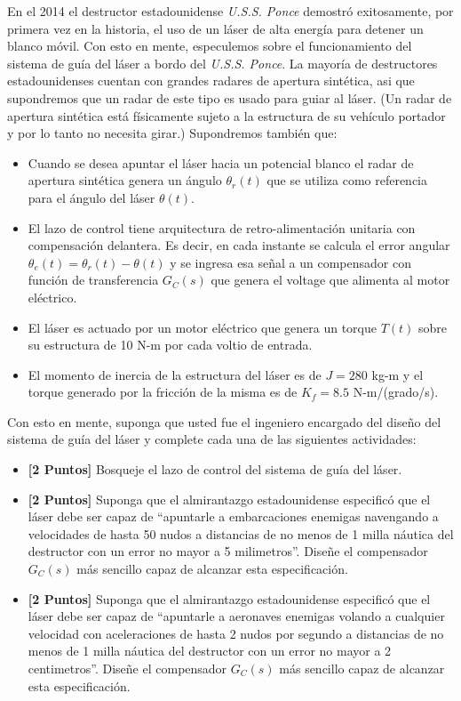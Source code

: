 \documentclass[ a4paper, twoside, 11pt]{article}
\begin{document}
\begin{problem}
En el 2014 el destructor estadounidense \emph{U.S.S. Ponce} demostr\'o exitosamente, por primera vez en la historia, el uso de un l\'aser de alta energ\'ia para detener un blanco m\'ovil. Con esto en mente, especulemos sobre el funcionamiento del sistema de gu\'ia del l\'aser a bordo del \emph{U.S.S. Ponce}. La mayor\'ia de destructores estadounidenses cuentan con grandes radares de apertura sint\'etica, asi que supondremos que un radar de este tipo es usado para guiar al l\'aser. (Un radar de apertura sint\'etica est\'a f\'isicamente sujeto a la estructura de su veh\'iculo portador y por lo tanto no necesita girar.) Supondremos tambi\'en que: 
\begin{itemize}
\item Cuando se desea apuntar el l\'aser hacia un potencial blanco el radar de apertura sint\'etica genera un \'angulo $\theta_r(t)$ que se utiliza como referencia para el \'angulo del l\'aser $\theta(t)$. 
\item El lazo de control tiene arquitectura de retro-alimentaci\'on unitaria con compensaci\'on delantera. Es decir, en cada instante se calcula el error angular $\theta_e(t) = \theta_r(t) - \theta(t)$ y se ingresa esa se\~nal a un compensador con funci\'on de transferencia $G_C(s)$ que genera el voltage que alimenta al motor el\'ectrico. 
\item El l\'aser es actuado por un motor el\'ectrico que genera un torque $T(t)$ sobre su estructura de 10 N-m por cada voltio de entrada. 
\item El momento de inercia de la estructura del l\'aser es de $J = 280$ kg-m y el torque generado por la fricci\'on de la misma es de $K_f = 8.5$ N-m/(grado/s). 
\end{itemize}

Con esto en mente, suponga que usted fue el ingeniero encargado del dise\~no del sistema de gu\'ia del l\'aser y complete cada una de las siguientes actividades: 
\begin{itemize}
\item \textbf{[2 Puntos]} Bosqueje el lazo de control del sistema de gu\'ia del l\'aser. 
\item \textbf{[2 Puntos]} Suponga que el almirantazgo estadounidense especific\'o que el l\'aser debe ser capaz de ``apuntarle a embarcaciones enemigas navengando a velocidades de hasta 50 nudos a distancias de no menos de 1 milla n\'autica del destructor con un error no mayor a 5 milimetros''. Dise\~ne el compensador $G_C(s)$ m\'as sencillo capaz de alcanzar esta especificaci\'on. 
\item \textbf{[2 Puntos]} Suponga que el almirantazgo estadounidense especific\'o que el l\'aser debe ser capaz de ``apuntarle a aeronaves enemigas volando a cualquier velocidad con aceleraciones de hasta 2 nudos por segundo a distancias de no menos de 1 milla n\'autica del destructor con un error no mayor a 2 centimetros''. Dise\~ne el compensador $G_C(s)$ m\'as sencillo capaz de alcanzar esta especificaci\'on. 
\end{itemize}


\end{problem}
\end{document}
